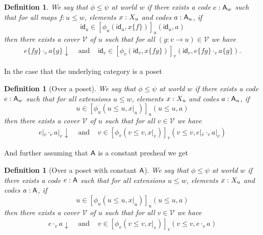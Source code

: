 \documentclass[11pt]{article}
\newtheorem{defn}[thrm]{Definition}
\begin{document}
\begin{defn}
  We say that \(\phi \leq \psi\) at world \(w\) if there exists a code
  \(e : \mathsf{A}_{w}\) such that for all maps \(f : u \leq w\), elements
  \(x : X_{u}\) and codes \(a : \mathsf{A}_{u}\), if
  \[
    \mathsf{id}_{u} \in [\phi_{u}(\mathsf{id}_{u}, x\{f\})]_{u}(\mathsf{id}_{u},a)
  \]
  then there exists a cover \(\mathcal{V}\) of \(u\) such that for all
  \((g : v \to u) \in \mathcal{V}\) we have
  \[\begin{array}{ccc}
  e\{fg\} \cdot_{v} a\{g\} \downarrow &\text{ and }&
  \mathsf{id}_{v} \in [\phi_{v}(\mathsf{id}_{v}, x\{fg\})]_{v}(\mathsf{id}_{v},e\{fg\} \cdot_{v} a\{g\}).
  \end{array}\]
\end{defn}

In the case that the underlying category is a poset
%
\begin{defn}[Over a poset]
  We say that \(\phi \leq \psi\) at world \(w\) if there exists a code
  \(e : \mathsf{A}_{w}\) such that for all extensions \(u \leq w\), elements
  \(x : X_{u}\) and codes \(a : \mathsf{A}_{u}\), if
  \[
    u \in [\phi_{u}(u\leq u, x|_{u})]_{u}(u \leq u,a)
  \]
  then there exists a cover \(\mathcal{V}\) of \(u\) such that for all \(v \in \mathcal{V}\) we
  have
  \[\begin{array}{ccc}
    e|_{v} \cdot_{v} a|_{v} \downarrow &\text{ and }&
    v \in [\phi_{v}(v\leq v, x|_{v})]_{v}(v \leq v,e|_{v} \cdot_{v} a|_{v})
  \end{array}\]
\end{defn}

And further assuming that \(\mathsf{A}\) is a constant presheaf we get
%
\begin{defn}[Over a poset with constant \(\mathsf{A}\)]
  We say that \(\phi \leq \psi\) at world \(w\) if there exists a code
  \(e : \mathsf{A}\) such that for all extensions \(u \leq w\), elements
  \(x : X_{u}\) and codes \(a : \mathsf{A}\), if
  \[
    u \in [\phi_{u}(u\leq u, x|_{u})]_{u}(u \leq u,a)
  \]
  then there exists a cover \(\mathcal{V}\) of \(u\) such that for all \(v \in \mathcal{V}\) we
  have
  \[\begin{array}{ccc}
    e \cdot_{v} a \downarrow &\text{ and }&
    v \in [\phi_{v}(v\leq v, x|_{v})]_{v}(v \leq v,e \cdot_{v} a)
  \end{array}\]
\end{defn}
\end{document}
